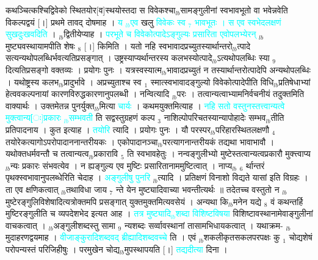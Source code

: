 \documentclass[article,12pt,a4paper]{memoir}%
\newcommand{\quotelemma}[1]{\textcolor{cyan}{#1}}
\begin{document}
कथञ्चित्कश्चिद्विवेको स्थितयोर[व]स्थयोस्तदा स विवेकश्चा{\tiny $_{lb}$}सामङ्गुलीनां स्वभावभूतो वा भवेन्नवेति विकल्पद्वयं [।] प्रथमे तावद् दोषमाह । \quotelemma{य {\tiny $_{lb}$}एव} खलु \quotelemma{विवेकः स्व {\tiny $_{7}$} भावभूतः । स एव स्वभेदलक्षणं सुखदुःखवदिति} \cite[5b6]{vn-msN} । {\tiny $_{lb}$}द्वितीयेप्याह । \quotelemma{परभूते च विवेकोत्पादेऽङ्गुल्यः प्रसारिता एवोपलभ्येरन्} \cite[5b6]{vn-msN} {\tiny $_{lb}$}मुष्ट्यवस्थायामपीति शेषः {\tiny $_{8}$} [।] किमिति । यतो नहि स्वभावादप्रच्युतस्यार्थान्तरो{\tiny $_{lb}$}त्पादे सत्यन्यथोपलब्धिर्भवत्यतिप्रसङ्गात् । उष्ट्रस्याप्यर्थान्तरस्य कलभस्योत्पादे{\tiny $_{lb}$}ऽत्यथोपलब्धिः स्या {\tiny $_{9}$} \leavevmode{} दित्यतिप्रसङ्गो वक्तव्यः । प्रयोगः पुनः । यत्रस्वस्यात्म{\tiny $_{lb}$}भावादप्रच्युतं न तस्यार्थान्तरोत्पादेपि अन्यथोपलब्धिः । यथोष्ट्रस्य कलभ{\tiny $_{lb}$}प्रादुर्भावे । अप्रच्युताश्च स्व {\tiny $_{1}$} स्मात्स्वभावादङ्गुल्यो विवेकोत्पादेपीति विधि{\tiny $_{lb}$}प्रतिषेधाभ्यां हेत्ववकल्पनायां कारणविरुद्धकारणानुपलब्धी । नन्वित्यादि {\tiny $_{lb}$}परः । तत्वान्यत्वाभ्यामनिर्वचनीयं तदुक्तमिति वाक्यार्थः । उक्तमेतन्न पुनर्युक्त{\tiny $_{lb}$}मित्या \quotelemma{चार्यः} । कथमयुक्तमित्याह । \quotelemma{नहि सतो वस्तुनस्तत्त्वान्यत्वे मुक्त्वान्य[ः]प्रकारः {\tiny $_{lb}$}सम्भवती} \cite[5b7]{vn-msN} ति सद्वस्तुग्रहणं कल्प {\tiny $_{3}$} नाशिल्पोपरिचतस्यान्यापोहादेः सम्भव{\tiny $_{lb}$}तीति प्रतिपादनाय । कुत इत्याह । \quotelemma{तयोरि} \cite[5b8]{vn-msN} त्यादि । प्रयोगः पुनः । यौ परस्पर{\tiny $_{lb}$}परिहारस्थितलक्षणौ {\tiny $_{4}$} तयोरेकत्यागोऽपरोपादाननान्तरीयकः । एकोपादानञ्चा{\tiny $_{lb}$}परत्यागनान्तरीयकं तद्यथा भावाभावौ । यथोक्तधर्मवन्तौ च तत्वान्यत्व{\tiny $_{lb}$}प्रकारावि {\tiny $_{5}$} ति स्वभावहेतुः । नन्वङ्गुलीभ्यो मुष्टेस्तत्वान्यत्वप्रकारौ मुक्त्त्वाप्य{\tiny $_{lb}$}न्यः प्रकारः संभवत्येव । न ह्यङ्गुल्य एव मुष्टिः प्रसारितानाममुष्टित्वात् । नाप्य{\tiny $_{lb}$} {\tiny $_{6}$} र्थान्तरं पृथक्स्वभावानुपलब्धेरिति चेदाह । \quotelemma{अङ्गुलीषु पुनरि} \cite[5b8]{vn-msN} {\tiny $_{lb}$}त्यादि । प्रतिक्षणं विनाशो विद्यते यासां इति विग्रहः । ता एव क्षणिकत्वात् {\tiny $_{lb}$}तथाविधा जाय {\tiny $_{7}$} न्ते येन मुष्ट्यादिवाच्या भवन्तीत्यर्थः ॥ तदेतच्च वस्तुतो न {\tiny $_{lb}$} \leavevmode{} मुष्टेरङ्गुलिविशेषादित्यत्रोक्तमपि प्रसङ्गात् युक्तमुक्तमित्यवसेयं । अन्यथा कि{\tiny $_{lb}$}मनेन यद्ये {\tiny $_{8}$} वं कथन्तर्हि मुष्टिरङ्गुलीति च व्यपदेशभेद इत्यत आह । \quotelemma{तत्र मुष्ट्यादि{\tiny $_{lb}$}शब्दा विशिष्टविषया} \cite[5b9]{vn-msN} विशिष्टावस्थानामेवाङ्गुलीनां वाचकत्वात् । {\tiny $_{lb}$}अङ्गुलीशब्दस्तु सामा {\tiny $_{9}$} \leavevmode{} न्यशब्दः सर्व्वावस्थानां तासामभिधायकत्वात् । यथाक्रम- {\tiny $_{lb}$}मुदाहरणद्वयमाह । \quotelemma{वीजाङ्कुरादिशब्दवद् ब्रीह्यादिशब्दवच्चे} \cite[5b9]{vn-msN} ति । एवं {\tiny $_{lb}$}शकलीकृतसकलपरपक्षः कु {\tiny $_{1}$} चोद्यशेषं परोपन्यस्तं परिजिहीषुः । परमुखेन चोद्य{\tiny $_{lb}$}मुपस्थापयति [।] \quotelemma{तद्यदीत्या} \cite[5b9]{vn-msN} दिना । 
\end{document}
